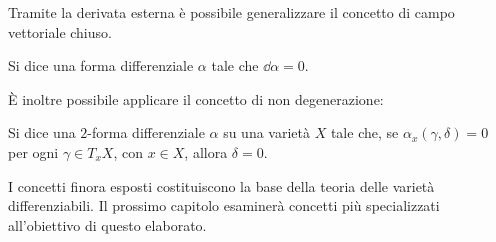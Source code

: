 Tramite la derivata esterna è possibile generalizzare il concetto di campo vettoriale chiuso.
\begin{definition}
  Si dice  una forma differenziale $\alpha$ tale che $\dd \alpha = 0$. 
\end{definition}

È inoltre possibile applicare il concetto di non degenerazione:
\begin{definition}
  Si dice  una $2$-forma differenziale $\alpha$ su una varietà $X$ tale che, se $\alpha_x (\gamma, \delta) = 0$ per ogni $\gamma \in T_x X$, con $x \in  X$, allora $\delta = 0$.
\end{definition}

I concetti finora esposti costituiscono la base della teoria delle varietà differenziabili. Il prossimo capitolo esaminerà concetti più specializzati all'obiettivo di questo elaborato.